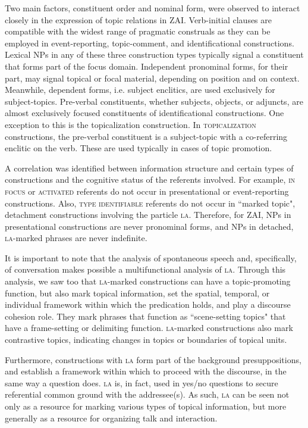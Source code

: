 Two main factors, constituent order and nominal form, were observed to interact closely in the expression of topic relations in ZAI. Verb-initial clauses are compatible with the widest range of pragmatic construals as they can be employed in event-reporting, topic-comment, and identificational constructions. Lexical NPs in any of these three construction types typically signal a constituent that forms part of the focus domain. Independent pronominal forms, for their part, may signal topical or focal material, depending on position and on context. Meanwhile, dependent forms, i.e. subject enclitics, are used exclusively for subject-topics. Pre-verbal constituents, whether subjects, objects, or adjuncts, are almost exclusively focused constituents of identificational constructions. One exception to this is the topicalization construction. In \textsc{topicalization} constructions, the pre-verbal constituent is a subject-topic with a co-referring enclitic on the verb. These are used typically in cases of topic promotion.

A correlation was identified between information structure and certain types of constructions and the cognitive status of the referents involved. For example, \textsc{in focus} \citep{gundel1993} or \textsc{activated} referents do not occur in presentational or event-reporting constructions. Also, \textsc{type identifiable} referents do not occur in ``marked topic", detachment constructions involving the particle \textsc{la}. Therefore, for ZAI, NPs in presentational constructions are never pronominal forms, and NPs in detached, \textsc{la}-marked phrases are never indefinite.

It is important to note that the analysis of spontaneous speech and, specifically, of conversation makes possible a multifunctional analysis of \textsc{la}. Through this analysis, we saw too that \textsc{la}-marked constructions can have a topic-promoting function, but also mark topical information, set the spatial, temporal, or individual framework within which the predication holds, and play a discourse cohesion role. They mark phrases that function as ``scene-setting topics" that have a frame-setting or delimiting function. \textsc{la}-marked constructions also mark contrastive topics, indicating changes in topics or boundaries of topical units. 

Furthermore, constructions with \textsc{la} form part of the background presuppositions, and establish a framework within which to proceed with the discourse, in the same way a question does. \textsc{la} is, in fact, used in yes/no questions to secure referential common ground with the addressee(s). As such, \textsc{la} can be seen not only as a resource for marking various types of topical information, but more generally as a resource for organizing talk and interaction. 


